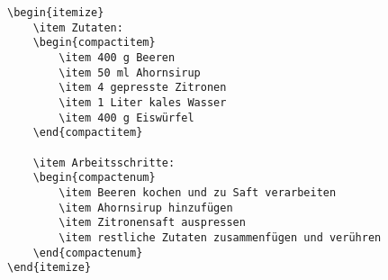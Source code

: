 \begin{verbatim}
\begin{itemize}
	\item Zutaten:
	\begin{compactitem}
		\item 400 g Beeren
		\item 50 ml Ahornsirup 
		\item 4 gepresste Zitronen
		\item 1 Liter kales Wasser
		\item 400 g Eiswürfel
	\end{compactitem}

	\item Arbeitsschritte:
	\begin{compactenum}
		\item Beeren kochen und zu Saft verarbeiten
		\item Ahornsirup hinzufügen
		\item Zitronensaft auspressen
		\item restliche Zutaten zusammenfügen und verühren
	\end{compactenum}
\end{itemize}
\end{verbatim}

